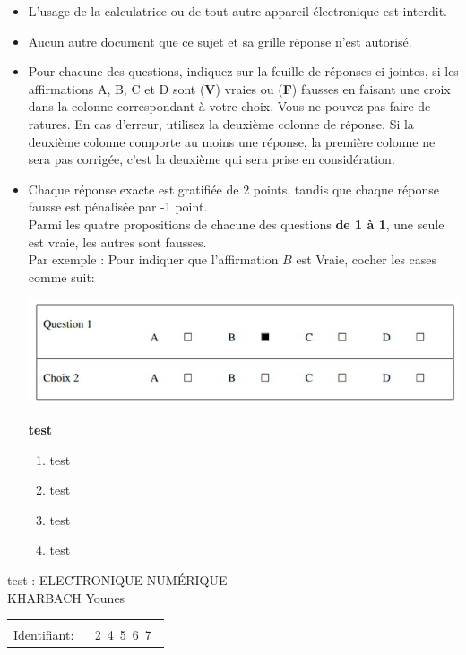 \documentclass{book}%
\begin{document}
\begin{itemize}%
\item%
L'usage de la calculatrice ou de tout autre appareil électronique est interdit.%
\item%
Aucun autre document que ce sujet et sa grille réponse n'est autorisé.%
\item%
Pour chacune des questions, indiquez sur la feuille de réponses ci-jointes, si les affirmations A, B, C et D sont (\textbf{V}) vraies ou (\textbf{F}) fausses en faisant une croix dans la colonne correspondant à votre choix. Vous ne pouvez pas faire de ratures. En cas d'erreur, utilisez la deuxième colonne de réponse. Si la deuxième colonne comporte au moins une réponse, la première colonne ne sera pas corrigée, c'est la deuxième qui sera prise en considération.%
\item%
Chaque réponse exacte est gratifiée de 2 points, tandis que chaque réponse fausse est pénalisée par -1 point. \\ 	Parmi les quatre propositions de chacune des questions \textbf{de 1 à 1}, une seule est vraie, les autres sont fausses. \\ 	Par exemple : Pour indiquer que l'affirmation $B$ est Vraie, cocher les cases comme suit:  \\ \begin{center}	\includegraphics[scale=0.8]{reponses.png} \end{center}%
\thispagestyle{empty}%
\begin{exercise}%
\textbf{test }%
\begin{enumerate}[label=\textbf{\Alph*. }]%
\item%
test%
\item%
test%
\item%
test%
\item%
test%
\end{enumerate}%
\end{exercise}%
\end{itemize}%
\newpage%
\thispagestyle{empty}%
test : ELECTRONIQUE NUMÉRIQUE $\qquad \qquad \qquad \qquad \qquad \qquad \qquad \qquad$ KHARBACH Younes%
\begin{flushright}%
\begin{tabular}{|l|}%
\hline%
 \\%
\thispagestyle{empty}%
Identifiant: $\quad$ {\Large 2~4~5~6~7~}%
 \\%
\hline%
\end{tabular}%
\end{flushright}%
\end{document}
